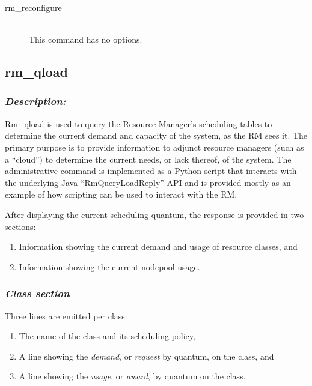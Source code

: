     \begin{description}
      \item[rm\_reconfigure] \hfill \\ 
        This command has no options.
      \end{description}
             
       


\subsection{rm\_qload}
\label{subsec:admin.rm-qload}

    \subsubsection{{\em Description:}}
    Rm\_qload is used to query the Resource Manager's scheduling tables to determine the
    current demand and capacity of the system, as the RM sees it.  The primary purpose
    is to provide information to adjunct resource managers (such as a ``cloud'') to
    determine the current needs, or lack thereof, of the system.  The administrative
    command is implemented as a Python script that interacts with the underlying
    Java ``RmQueryLoadReply'' API and is provided mostly as an example of how
    scripting can be used to interact with the RM.

    After displaying the current scheduling quantum, the response is provided in two sections:
    \begin{enumerate}
      \item Information showing the current demand and usage of resource classes, and
      \item Information showing the current nodepool usage.
    \end{enumerate}

    \subsubsection{\em Class section}
    Three lines are emitted per class:
    \begin{enumerate}
      \item The name of the class and its scheduling policy,
      \item A line showing the {\em demand}, or {\em request} by quantum, on the class, and
      \item A line showing the {\em usage}, or {\em award}, by quantum on the class.
    \end{enumerate}
    

